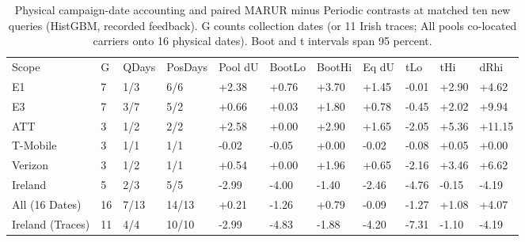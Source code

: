 \begin{table}[!ht]
\centering\footnotesize\setlength{\tabcolsep}{2.4pt}
\caption{Physical campaign-date accounting and paired MARUR minus Periodic contrasts at matched ten new queries (HistGBM, recorded feedback). G counts collection dates (or 11 Irish traces; All pools co-located carriers onto 16 physical dates). Boot and t intervals span 95 percent.}
\begin{tabular}{lllllllllll}
\hline
Scope & G & QDays & PosDays & Pool dU & BootLo & BootHi & Eq dU & tLo & tHi & dRhi \\
E1 & 7 & 1/3 & 6/6 & +2.38 & +0.76 & +3.70 & +1.45 & -0.01 & +2.90 & +4.62 \\
E3 & 7 & 3/7 & 5/2 & +0.66 & +0.03 & +1.80 & +0.78 & -0.45 & +2.02 & +9.94 \\
ATT & 3 & 1/2 & 2/2 & +2.58 & +0.00 & +2.90 & +1.65 & -2.05 & +5.36 & +11.15 \\
T-Mobile & 3 & 1/1 & 1/1 & -0.02 & -0.05 & +0.00 & -0.02 & -0.08 & +0.05 & +0.00 \\
Verizon & 3 & 1/2 & 1/1 & +0.54 & +0.00 & +1.96 & +0.65 & -2.16 & +3.46 & +6.62 \\
Ireland & 5 & 2/3 & 5/5 & -2.99 & -4.00 & -1.40 & -2.46 & -4.76 & -0.15 & -4.19 \\
All (16 Dates) & 16 & 7/13 & 14/13 & +0.21 & -1.26 & +0.79 & -0.09 & -1.27 & +1.08 & +4.07 \\
Ireland (Traces) & 11 & 4/4 & 10/10 & -2.99 & -4.83 & -1.88 & -4.20 & -7.31 & -1.10 & -4.19 \\
\hline
\end{tabular}
\end{table}
